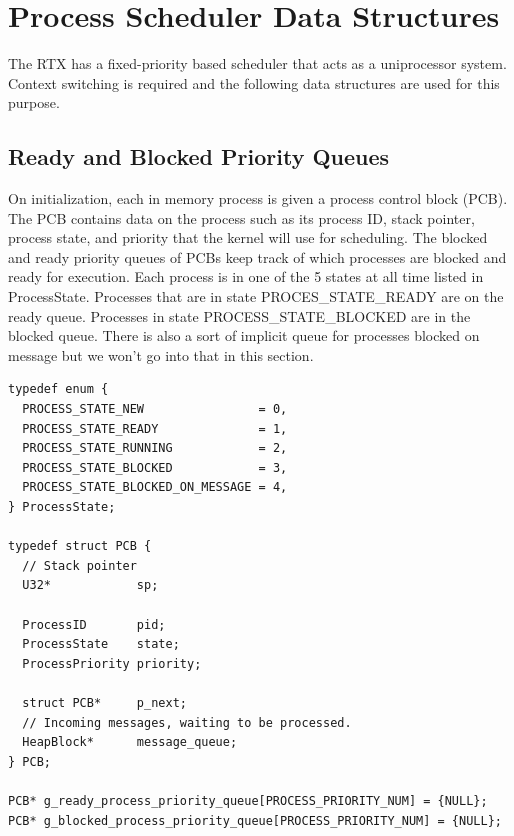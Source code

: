 \documentclass[12pt]{report}
\begin{document}
\section{Process Scheduler Data Structures}
The RTX has a fixed-priority based scheduler that acts as a uniprocessor system. Context switching is required and the following data structures are used for this purpose.

\subsection{Ready and Blocked Priority Queues}
On initialization, each in memory process is given a process control block (PCB). The PCB contains data on the process such as its process ID, stack pointer, process state, and priority that the kernel will use for scheduling. The blocked and ready priority queues of PCBs keep track of which processes are blocked and ready for execution. Each process is in one of the 5 states at all time listed in ProcessState. Processes that are in state PROCES\_STATE\_READY are on the ready queue. Processes in state PROCESS\_STATE\_BLOCKED are in the blocked queue. There is also a sort of implicit queue for processes blocked on message but we won't go into that in this section.

\begin{lstlisting}
typedef enum {
  PROCESS_STATE_NEW                = 0,
  PROCESS_STATE_READY              = 1,
  PROCESS_STATE_RUNNING            = 2,
  PROCESS_STATE_BLOCKED            = 3,
  PROCESS_STATE_BLOCKED_ON_MESSAGE = 4,
} ProcessState;

typedef struct PCB {
  // Stack pointer
  U32*            sp;

  ProcessID       pid;
  ProcessState    state;
  ProcessPriority priority;

  struct PCB*     p_next;
  // Incoming messages, waiting to be processed.
  HeapBlock*      message_queue;
} PCB;

PCB* g_ready_process_priority_queue[PROCESS_PRIORITY_NUM] = {NULL};
PCB* g_blocked_process_priority_queue[PROCESS_PRIORITY_NUM] = {NULL};
\end{lstlisting}
\end{document}
